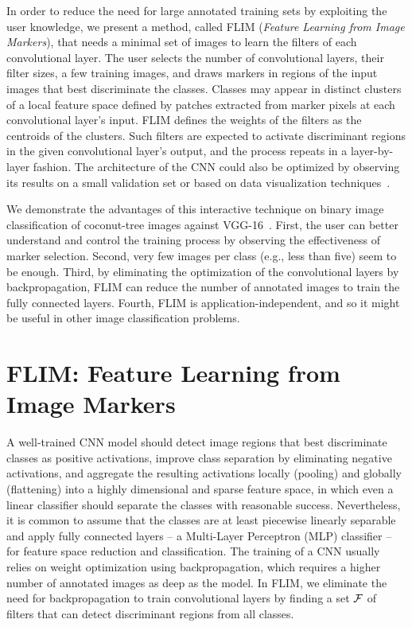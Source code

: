 \documentclass[a4paper,conference]{IEEEtran}
\begin{document}
In order to reduce the need for large annotated training sets by exploiting the user knowledge, we present a method, called FLIM (\emph{Feature Learning from Image Markers}), that needs a minimal set of images to learn the filters of each convolutional layer. The user selects the number of convolutional layers, their filter sizes, a few training images, and draws markers in regions of the input images that best discriminate the classes. Classes may appear in distinct clusters of a local feature space defined by patches extracted from marker pixels at each convolutional layer's input. FLIM defines the weights of the filters as the centroids of the clusters. Such filters are expected to activate discriminant regions in the given convolutional layer's output, and the process repeats in a layer-by-layer fashion. The architecture of the CNN could also be optimized by observing its results on a small validation set or based on data visualization techniques~\cite{rauber2016visualizing}.

We demonstrate the advantages of this interactive technique on binary image classification of coconut-tree images against  VGG-16~\cite{simonyan2014very}. First, the user can better understand and control the training process by observing the effectiveness of marker selection.  Second, very few images per class (e.g., less than five) seem to be enough. Third, by eliminating the optimization of the convolutional layers by backpropagation, FLIM can reduce the number of annotated images to train the fully connected layers. Fourth, FLIM is application-independent, and so it might be useful in other image classification problems.

\section{FLIM: Feature Learning  from Image Markers}
\label{sec:method}
  
A well-trained CNN model should detect image regions that best discriminate classes as positive activations, improve class separation by eliminating negative activations, and aggregate the resulting activations locally (pooling) and globally (flattening) into a highly dimensional and sparse feature space, in which even a linear classifier should separate the classes with reasonable success. Nevertheless, it is common to assume that the classes are at least piecewise linearly separable and apply fully connected layers -- a Multi-Layer Perceptron (MLP) classifier -- for feature space reduction and classification. The training of a CNN usually relies on weight optimization using backpropagation, which requires a higher number of annotated images as deep as the model. In FLIM, we eliminate the need for backpropagation to train convolutional layers by finding a set ${\cal F}$ of filters that can detect discriminant regions from all classes.
\end{document}
